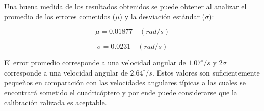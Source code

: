 \documentclass[main]{subfiles}
\begin{document}
Una buena medida de los resultados obtenidos se puede obtener al analizar el promedio de los errores cometidos ($\mu$) y la desviación estándar ($\sigma$):

\begin{equation}
\mu=0.01877 \quad (rad/s)
\label{ec:mu_gyro}
\end{equation}

\begin{equation}
\sigma=0.0231 \quad (rad/s)
\label{ec:sigma_gyro}
\end{equation}

El error promedio corresponde a una velocidad angular de $1.07^\circ/s$ y $2\sigma$ corresponde a una velocidad angular de $2.64^\circ/s$. Estos valores son suficientemente pequeños en comparaci\'on con las velocidades angulares t\'ipicas a las cuales se encontrar\'a sometido el cuadric\'optero y por ende puede considerarse que la calibraci\'on ralizada es aceptable.
\end{document}
